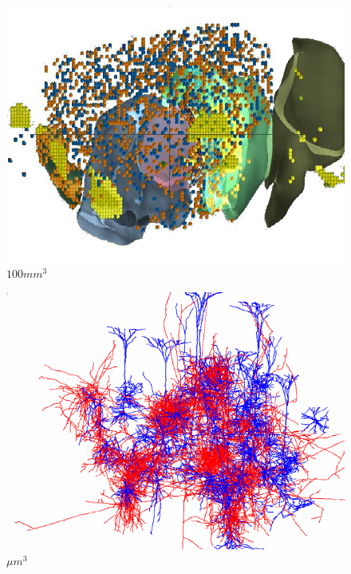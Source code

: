 \documentclass{beamer}
\begin{document}
\begin{frame}
\begin{itemize}
\begin{figure}
\centering
\begin{minipage}{.45\textwidth}
\centering
\includegraphics[scale=0.33]{pasted34.png} 
\vfill$100mm^{3}$
\end{minipage}
\begin{minipage}{.45\textwidth}
\centering
\includegraphics[scale=0.33]{pasted35}
\vfill$\mu m^{3}$
\end{minipage}
\vfill
\end{figure}


\end{itemize}
\end{frame}
\end{document}
